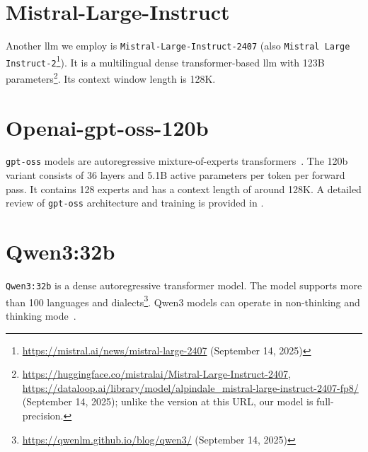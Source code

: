 \section{Mistral-Large-Instruct}

Another \ac{llm} we employ is \texttt{Mistral-Large-Instruct-2407} (also \texttt{Mistral Large Instruct-2}\footnote{\url{https://mistral.ai/news/mistral-large-2407} (September 14, 2025)}).
It is a multilingual dense transformer-based \ac{llm} with 123B parameters\footnote{\url{https://huggingface.co/mistralai/Mistral-Large-Instruct-2407},\\ \url{https://dataloop.ai/library/model/alpindale_mistral-large-instruct-2407-fp8/} (September 14, 2025); unlike the version at this URL, our model is full-precision.}.
Its context window length is 128K.

\section{Openai-gpt-oss-120b}

\texttt{gpt-oss} models are autoregressive mixture-of-experts transformers~\citep{openai2025gptoss120bgptoss20bmodel}.
The 120b variant consists of 36 layers and 5.1B active parameters per token per forward pass.
It contains 128 experts and has a context length of around 128K.
A detailed review of \texttt{gpt-oss} architecture and training is provided in \citep{openai2025gptoss120bgptoss20bmodel}.


\section{Qwen3:32b}
\texttt{Qwen3:32b} is a dense autoregressive transformer model.
The model supports more than 100 languages and dialects\footnote{\url{https://qwenlm.github.io/blog/qwen3/} (September 14, 2025)}.
Qwen3 models can operate in non-thinking and thinking mode~\citep{qwen3_technical_report}.
